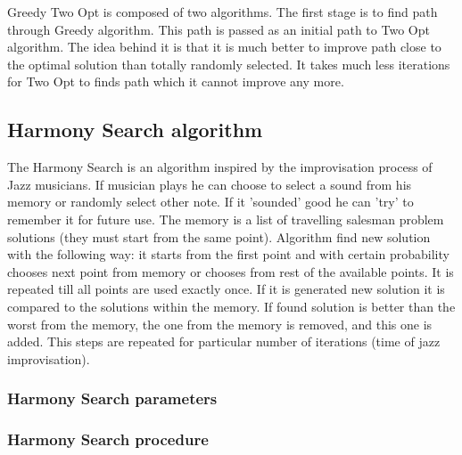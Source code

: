 \documentclass[titlepage]{article}
\begin{document}
Greedy Two Opt is composed of two algorithms. The first stage is to find path through Greedy algorithm. This path is passed as an initial path to Two Opt algorithm. The idea behind it is that it is much better to improve path close to the optimal solution than totally randomly selected. It takes much less iterations for Two Opt to finds path which it cannot improve any more. 

\subsection{Harmony Search algorithm}

The Harmony Search is an algorithm inspired by the improvisation process of Jazz musicians. If musician plays he can choose to select a sound from his memory or randomly select other note. If it 'sounded' good he can 'try' to remember it for future use. The memory is a list of travelling salesman problem solutions (they must start from the same point). Algorithm find new solution with the following way: it starts from the first point and with certain probability chooses next point from memory or chooses from rest of the available points. It is repeated till all points are used exactly once. If it is generated new solution it is compared to the solutions within the memory. If found solution is better than the worst from the memory, the one from the memory is removed, and this one is added. This steps are repeated for particular number of iterations (time of jazz improvisation).

\subsubsection{Harmony Search parameters}

\subsubsection{Harmony Search procedure}
\end{document}
